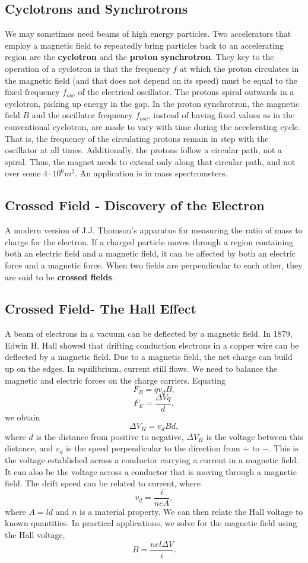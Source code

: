 \documentclass[11pt]{article}
\theoremstyle{plain} %
\theoremstyle{definition}
\theoremstyle{example}
\theoremstyle{remark}
\begin{document}
\subsection{Cyclotrons and Synchrotrons}
We may sometimes need beams of high energy particles. Two accelerators that employ a magnetic field to repeatedly bring particles back to an accelerating region are the \textbf{cyclotron} and the \textbf{proton synchrotron}. They key to the operation of a cyclotron is that the frequency $f$ at which the proton circulates in the magnetic field (and that does not depend on its speed) must be equal to the fixed frequency $f_{osc}$ of the electrical oscillator. The protons spiral outwards in a cyclotron, picking up energy in the gap. In the proton synchrotron, the magnetic field $B$ and the oscillator frequency $f_{osc}$, instead of having fixed values as in the conventional cyclotron, are made to vary with time during the accelerating cycle. That is, the frequency of the circulating protons remain in step with the oscillator at all times. Additionally, the protons follow a circular path, not a spiral. Thus, the magnet needs to extend only along that circular path, and not over some $4\cdot 10^6 m^2$. An application is in mass spectrometers. 
\subsection{Crossed Field - Discovery of the Electron}
A modern version of J.J. Thomson's apparatus for measuring the ratio of mass to charge for the electron. If a charged particle moves through a region containing both an electric field and a magnetic field, it can be affected by both an electric force and a magnetic force. When two fields are perpendicular to each other, they are said to be \textbf{crossed fields}. 

\subsection{Crossed Field- The Hall Effect}
A beam of electrons in a vacuum can be deflected by a magnetic field. In 1879, Edwin H. Hall showed that drifting conduction electrons in a copper wire can be deflected by a magnetic field. Due to a magnetic field, the net charge can build up on the edges. In equilibrium, current still flows. We need to balance the magnetic and electric forces on the charge carriers. Equating 
$$F_B = qv_dB,$$
$$F_E = \frac{\Delta V q}{d},$$
we obtain 
$$\Delta V_H = v_dBd,$$
where $d$ is the distance from positive to negative, $\Delta V_H$ is the voltage between this distance, and $v_d$ is the speed perpendicular to the direction from $+$ to $-$. This is the voltage established across a conductor carrying a current in a magnetic field. It can also be the voltage across a conductor that is moving through a magnetic field. The drift speed can be related to current, where 
$$v_d = \frac{i}{neA},$$
where $A=ld$ and $n$ is a material property. We can then relate the Hall voltage to known quantities. In practical applications, we solve for the magnetic field using the Hall voltage, 
$$B = \frac{nel\Delta V}{i}.$$
\end{document}
